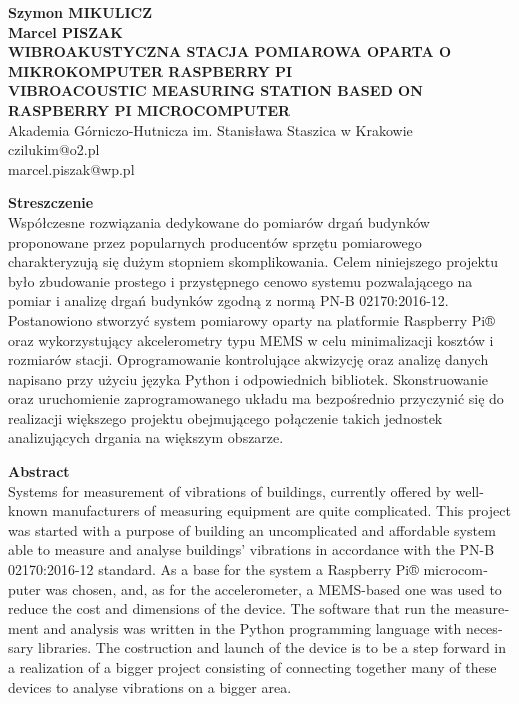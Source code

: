 \documentclass[a4paper,12pt]{mwart}
\begin{document}
\onehalfspacing
{\raggedright%
  \textbf{Szymon \MakeUppercase{Mikulicz}} \\
  \textbf{Marcel \MakeUppercase{Piszak}} \\
  \vspace*{5pt}%
  \MakeUppercase{\textbf{Wibroakustyczna stacja pomiarowa oparta o mikrokomputer Raspberry Pi}} \\
  \vspace*{5pt}%
  \MakeUppercase{\textbf{Vibroacoustic measuring station based on Raspberry Pi microcomputer}} \\
  \vspace*{5pt}%
  Akademia Górniczo-Hutnicza im. Stanisława Staszica w Krakowie\\
  \vspace*{5pt}%
  czilukim@o2.pl \\
  marcel.piszak@wp.pl \\
  \vspace*{5pt}%
}%
\noindent\textbf{Streszczenie}\\
Współczesne rozwiązania dedykowane do pomiarów drgań budynków proponowane przez
popularnych producentów sprzętu pomiarowego charakteryzują się dużym stopniem
skomplikowania. Celem niniejszego projektu było zbudowanie prostego i
przystępnego cenowo systemu pozwalającego na pomiar i analizę drgań budynków
zgodną z normą PN-B 02170:2016-12. Postanowiono stworzyć system pomiarowy
oparty na platformie Raspberry Pi® oraz wykorzystujący akcelerometry typu MEMS
w celu minimalizacji kosztów i rozmiarów stacji. Oprogramowanie kontrolujące
akwizycję oraz analizę danych napisano przy użyciu języka Python i odpowiednich
bibliotek. Skonstruowanie oraz uruchomienie zaprogramowanego układu ma
bezpośrednio przyczynić się do realizacji większego projektu obejmującego
połączenie takich jednostek analizujących drgania na większym obszarze.
\vspace*{5pt}

\noindent
\begin{otherlanguage}{english}
\textbf{Abstract} \\
Systems for measurement of vibrations of buildings, currently offered by
well-known manufacturers of measuring equipment are quite complicated. This
project was started with a purpose of building an uncomplicated and affordable
system able to measure and analyse buildings' vibrations in accordance with the
PN-B 02170:2016-12 standard. As a base for the system a Raspberry Pi®
microcomputer was chosen, and, as for the accelerometer, a MEMS-based one was
used to reduce the cost and dimensions of the device. The software that run the
measurement and analysis was written in the Python programming language with
necessary libraries. The costruction and launch of the device is to be a step
forward in a realization of a bigger project consisting of connecting together
many of these devices to analyse vibrations on a bigger area.
\end{otherlanguage}
\vspace*{24pt}
\end{document}
